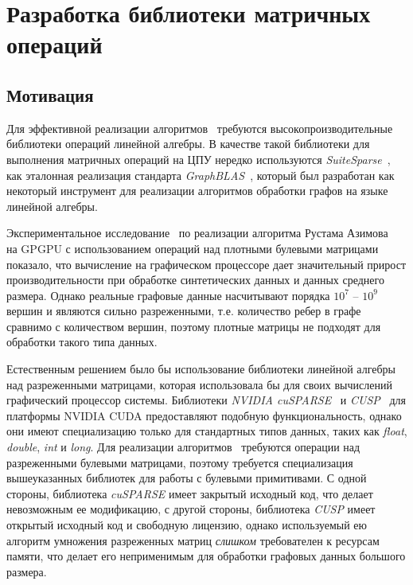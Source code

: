 \section{Разработка библиотеки матричных операций}
 
\subsection{Мотивация}

Для эффективной реализации алгоритмов~\cite{inbook:kronecker_cfpq_adbis, inproceedings:matrix_cfpq} требуются высокопроизводительные библиотеки операций линейной алгебры. В качестве такой библиотеки для выполнения матричных операций на ЦПУ нередко используются \textit{SuiteSparse}~\cite{net:suite_sparse},  как эталонная реализация стандарта \textit{GraphBLAS}~\cite{net:graphblas}, который был разработан как некоторый инструмент для реализации алгоритмов обработки графов на языке линейной алгебры.  

Экспериментальное исследование~\cite{inproceedings:cfpq_matrix_evaluation} по реализации алгоритма Рустама Азимова~\cite{inproceedings:matrix_cfpq} на GPGPU с использованием операций над плотными булевыми матрицами показало, что вычисление на графическом процессоре дает значительный прирост производительности при обработке синтетических данных и данных среднего размера. Однако реальные графовые данные насчитывают порядка $10^7$ -- $10^9$ вершин и являются сильно разреженными, т.е. количество ребер в графе сравнимо с количеством вершин, поэтому плотные матрицы не подходят для обработки такого типа данных. 

Естественным решением было бы использование библиотеки линейной алгебры над разреженными матрицами, которая использовала бы для своих вычислений графический процессор системы. Библиотеки \textit{NVIDIA cuSPARSE}~\cite{net:cusparse_docs} и \textit{CUSP}~\cite{net:cusplibrary} для платформы NVIDIA CUDA предоставляют подобную функциональность, однако они имеют специализацию только для стандартных типов данных, таких как \textit{float}, \textit{double}, \textit{int} и \textit{long}. Для реализации алгоритмов~\cite{inbook:kronecker_cfpq_adbis, inproceedings:matrix_cfpq} требуются операции над разреженными булевыми матрицами, поэтому требуется специализация вышеуказанных библиотек для работы с булевыми примитивами. С одной стороны, библиотека \textit{cuSPARSE} имеет закрытый исходный код, что делает невозможным ее модификацию, с другой стороны, библиотека \textit{CUSP} имеет открытый исходный код и свободную лицензию, однако используемый ею алгоритм умножения разреженных матриц \textit{слишком} требователен к ресурсам памяти, что делает его неприменимым для обработки графовых данных большого размера.

